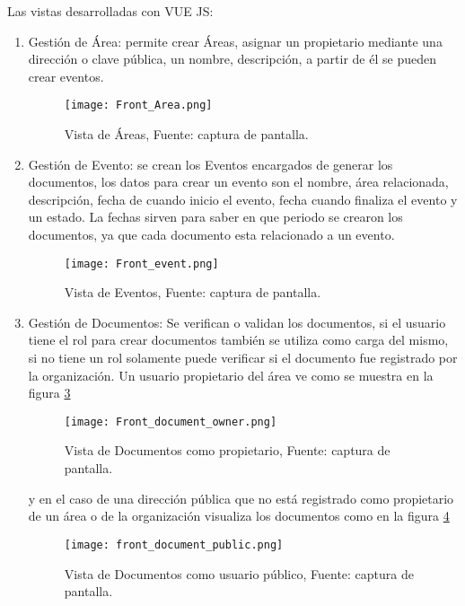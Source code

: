 Las vistas desarrolladas  con VUE JS:
\begin{enumerate}
  \item Gestión de Área: permite crear  Áreas, asignar un propietario mediante una dirección o clave pública, un nombre, descripción,
  a partir de él se pueden crear eventos.

  \begin{figure}[H]
    \centering
    {\texttt{[image: Front\_Area.png]}}
    \caption{Vista de Áreas, Fuente: captura de pantalla. }
    \label{img:front_area}
  \end{figure}

  \item Gestión de Evento: se crean los Eventos encargados de generar los documentos, los datos para crear un evento son el nombre, 
  área relacionada, descripción, fecha de cuando inicio el evento, fecha cuando finaliza el evento y un estado. 
  La fechas sirven para saber en que periodo se crearon los documentos, ya que cada documento esta relacionado  a un evento.
  \begin{figure}[H]
    \centering
    {\texttt{[image: Front\_event.png]}}
    \caption{Vista de Eventos,  Fuente: captura de pantalla. }
    \label{img:front_event}
  \end{figure}     
  
  \item Gestión de Documentos: Se verifican o validan los documentos, si el usuario tiene el rol para crear documentos 
  también se utiliza como carga del mismo, si no tiene un rol solamente puede verificar si el documento fue registrado por la organización. 
  Un usuario propietario del área ve como se muestra en la figura \ref{img:front_document_owner}  
  \begin{figure}[H]
    \centering
    {\texttt{[image: Front\_document\_owner.png]}}
    \caption{Vista de Documentos como propietario,  Fuente: captura de pantalla. }
    \label{img:front_document_owner}
  \end{figure}
  y en el caso de una dirección pública que 
  no está registrado como propietario de un área o de la organización visualiza los documentos como en la figura \ref{img:front_document_public}
  \begin{figure}[H]
    \centering
    {\texttt{[image: front\_document\_public.png]}}
    \caption{Vista de Documentos como usuario público,  Fuente: captura de pantalla. }
    \label{img:front_document_public}
  \end{figure}


\end{enumerate}

